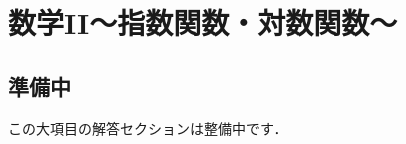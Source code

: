\documentclass[../../ms_a.tex]{subfiles}
\begin{document}
\section{数学II～指数関数・対数関数～}

\subsection*{準備中}
この大項目の解答セクションは整備中です．
\end{document}
